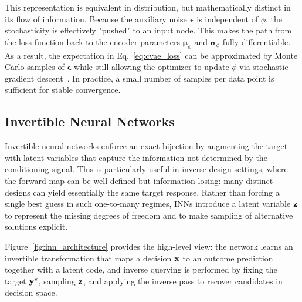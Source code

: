 This representation is equivalent in distribution, but mathematically distinct in its flow of information. Because the auxiliary noise $\boldsymbol{\epsilon}$ is independent of $\phi$, the stochasticity is effectively "pushed" to an input node. This makes the path from the loss function back to the encoder parameters $\boldsymbol{\mu}_\phi$ and $\boldsymbol{\sigma}_\phi$ fully differentiable. As a result, the expectation in Eq.~\eqref{eq:cvae_loss} can be approximated by Monte Carlo samples of $\boldsymbol{\epsilon}$ while still allowing the optimizer to update $\phi$ via stochastic gradient descent~\cite{Rezende2014VAE}. In practice, a small number of samples per data point is sufficient for stable convergence.


\subsection{Invertible Neural Networks}\label{sec:inn}

Invertible neural networks enforce an exact bijection by augmenting the target with latent variables that capture the information not determined by the conditioning signal. This is particularly useful in inverse design settings, where the forward map can be well-defined but information-losing: many distinct designs can yield essentially the same target response. Rather than forcing a single best guess in such one-to-many regimes, INNs introduce a latent variable $\mathbf{z}$ to represent the missing degrees of freedom and to make sampling of alternative solutions explicit.

Figure~\ref{fig:inn_architecture} provides the high-level view: the network learns an invertible transformation that maps a decision $\mathbf{x}$ to an outcome prediction together with a latent code, and inverse querying is performed by fixing the target $\mathbf{y}^\star$, sampling $\mathbf{z}$, and applying the inverse pass to recover candidates in decision space.

